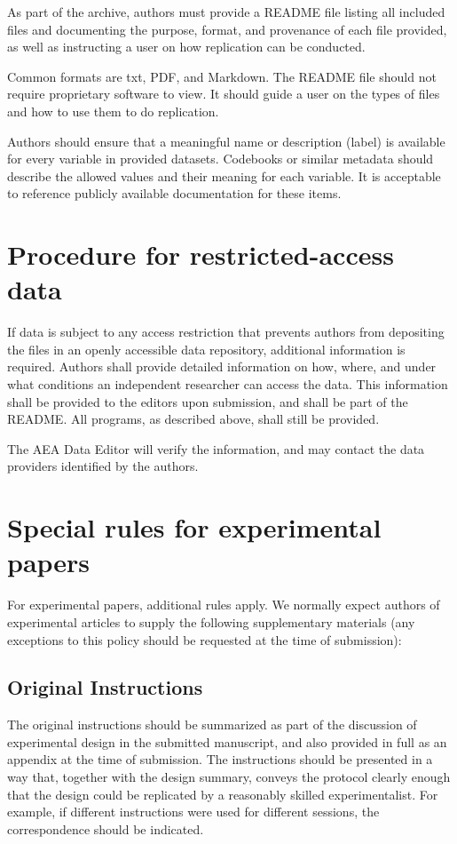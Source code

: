 \documentclass[PP]{AEA}
\begin{document}
As part of the archive, authors must provide a README file listing all included files and documenting the purpose, format, and provenance of each file provided, as well as instructing a user on how replication can be conducted.

Common formats are txt, PDF, and Markdown. The README file should not require proprietary software to view. It should guide a user on the types of files and how to use them to do replication.

Authors should ensure that a meaningful name or description (label) is available for every variable in provided datasets. Codebooks or similar metadata should describe the allowed values and their meaning for each variable. It is acceptable to reference publicly available documentation for these items.

\section{Procedure for restricted-access data}

If data is subject to any access restriction that prevents authors from depositing the files in an openly accessible data repository, additional information is required. Authors shall provide detailed information on how, where, and under what conditions an independent researcher can access the data. This information shall be provided to the editors upon submission, and shall be part of the README. All programs, as described above, shall still be provided.

The AEA Data Editor will verify the information, and may contact the data providers identified by the authors.

\section{Special rules for experimental papers}

For experimental papers, additional rules apply. We normally expect authors of experimental articles to supply the following  supplementary materials (any exceptions to this policy should be requested at the time of submission):

\subsection{Original Instructions}

The original instructions should be summarized as part of the discussion of experimental design in the submitted manuscript, and also provided in full as an appendix at the time of submission. The instructions should be presented in a way that, together with the design summary, conveys the protocol clearly enough that the design could be replicated by a reasonably skilled experimentalist. For example, if different instructions were used for different sessions, the correspondence should be indicated.
\end{document}

